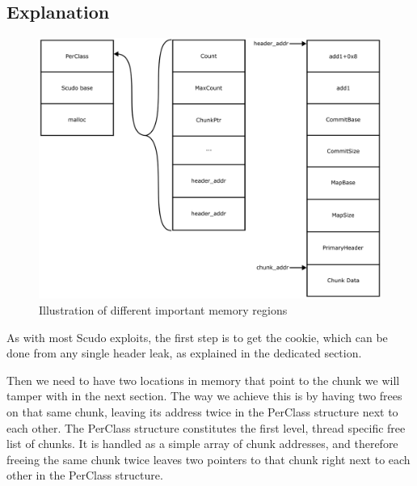 \documentclass[a4paper,11pt,oneside]{report}
\begin{document}
\subsection{Explanation}

\begin{figure}[h!]
  \centering
  \includegraphics[width=\linewidth]{figures/SafeUnlinkMemory.png}
  \caption{Illustration of different important memory regions
  }
  \label{fig:SafeUnlinkMemory}
\end{figure}

As with most Scudo exploits, the first step is to get the cookie, which can be done from
any single header leak, as explained in the dedicated section.


Then we need to have two locations in memory that point to the chunk we will tamper with
in the next section. The way we achieve this is by having two frees on that same chunk,
leaving its address twice in the PerClass structure next to each other. The PerClass
structure constitutes the first level, thread specific free list of chunks. It is handled
as a simple array of chunk addresses, and therefore freeing the same chunk twice leaves
two pointers to that chunk right next to each other in the PerClass structure. 
\end{document}

